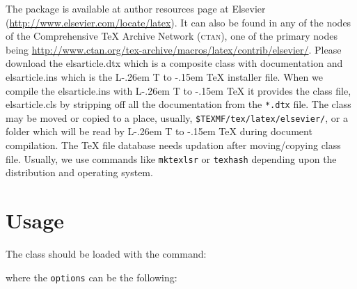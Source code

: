 \documentclass[a4paper,12pt]{article}
\makeatletter
\def\file#1{\textsf{#1}\xspace}
\DeclareRobustCommand{\LaTeX}{L\kern-.26em%
        {\sbox\z@ T%
         \vbox to\ht\z@{\hbox{\check@mathfonts
           \fontsize\sf@size\z@
           \math@fontsfalse\selectfont
          A\,}%
         \vss}%
        }%
     \kern-.15em%
    \TeX}
\makeatother
\begin{document}
The package is available at author resources page at Elsevier
(\url{http://www.elsevier.com/locate/latex}).
It can also be found in any of the nodes of the Comprehensive
\TeX{} Archive Network (\textsc{ctan}), one of the primary nodes
being
\url{http://www.ctan.org/tex-archive/macros/latex/contrib/elsevier/}.
Please download the \file{elsarticle.dtx} which is a composite
class with documentation and \file{elsarticle.ins} which is the
\LaTeX{} installer file. When we compile the
\file{elsarticle.ins} with \LaTeX{} it provides the class file,
\file{elsarticle.cls} by
stripping off all the documentation from the \verb+*.dtx+ file.
The class may be moved or copied to a place, usually,
\verb+$TEXMF/tex/latex/elsevier/+, %
or a folder which will be read                   
by \LaTeX{} during document compilation.  The \TeX{} file
database needs updation after moving/copying class file.  Usually,
we use commands like \verb+mktexlsr+ or \verb+texhash+ depending
upon the distribution and operating system.


\section{Usage}\label{sec:usage}
The class should be loaded with the command:


\noindent where the \verb+options+ can be the following:
\end{document}

